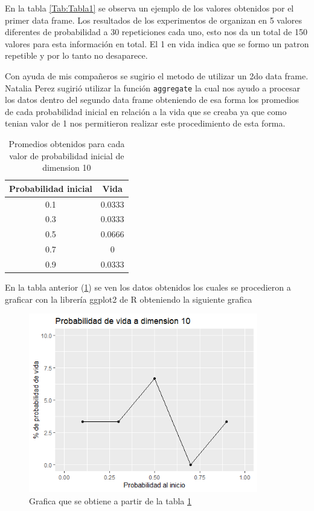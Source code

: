 \documentclass{article}
\begin{document}
En la tabla \ref{Tab:Tabla1} se observa un ejemplo de los valores obtenidos por el primer data frame. Los resultados de los experimentos de organizan en 5 valores diferentes de probabilidad a 30 repeticiones cada uno, esto nos da un total de 150 valores para esta información en total. El 1 en vida indica que se formo un patron repetible y por lo tanto no desaparece.

\vspace{5mm}
Con ayuda de mis compañeros se sugirio el metodo de utilizar un 2do data frame. Natalia Perez sugirió utilizar la función \texttt{aggregate} \cite{youtubeaggregate} la cual nos ayudo a procesar los datos dentro del segundo data frame obteniendo de esa forma los promedios de cada probabilidad inicial en relación a la vida que se creaba ya que como tenian valor de 1 nos permitieron realizar este procedimiento de esta forma.

\begin{table}[h!]
\begin{center}
\begin{tabular}{|c|c|}
\hline
Probabilidad inicial & Vida   \\ \hline
0.1 & 0.0333 \\ \hline
0.3 & 0.0333 \\ \hline
0.5 & 0.0666 \\ \hline
0.7 & 0      \\ \hline
0.9 & 0.0333 \\ \hline
\end{tabular}
\caption{Promedios obtenidos para cada valor de probabilidad inicial de dimension 10}
\label{Tab:Tabla2}
\end{center}
\end{table}

En la tabla anterior (\ref{Tab:Tabla2}) se ven los datos obtenidos los cuales se procedieron a graficar con la librería ggplot2 de R \cite{hadley,youtubePlot} obteniendo la siguiente grafica

\begin{figure} [h!]%
    \centering
    \includegraphics[width=100mm]{Figura1.png} %
    \caption{Grafica que se obtiene a partir de la tabla \ref{Tab:Tabla2}}
    \label{Figura1}
\end{figure}
\end{document}
